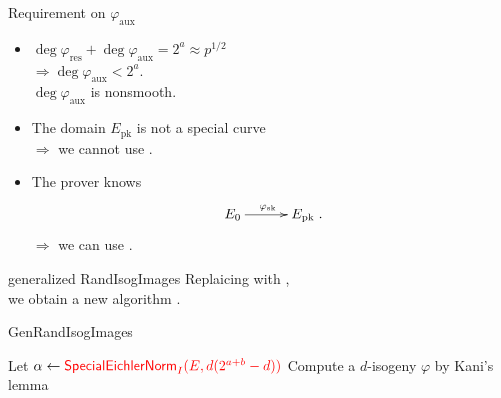 \begin{frame}{Requirement on $\varphi_\mathrm{aux}$}
    \begin{itemize}
        \setlength{\itemsep}{10pt}
        \item $\deg\varphi_\mathrm{res} + \deg\varphi_\mathrm{aux} = 2^a \approx p^{1/2}$\\[3pt]
            $\Rightarrow \deg\varphi_\mathrm{aux} < 2^a$.\\[3pt]
            \hphantom{$\Rightarrow$} $\deg\varphi_\mathrm{aux}$ is nonsmooth.
        \item The domain $E_\mathrm{pk}$ is not a special curve\\[3pt]
            $\Rightarrow$ we cannot use .
        \item The prover knows
                \begin{align*}
                    \xymatrix@C=30pt{
                        E_0 \ar[r]^{\varphi_\mathrm{sk}} & E_\mathrm{pk}
                    }.
                \end{align*}
            $\Rightarrow$ we can use .
    \end{itemize}

\end{frame}

\begin{frame}{generalized RandIsogImages}
    Replaicing  with ,\\
    we obtain a new algorithm .

    \vspace{10pt}
    \begin{algorithm}[H]
        \caption{\textsf{GenRandIsogImages}}
        \BlankLine
        Let $\alpha \leftarrow \textcolor{red}{\textsf{SpecialEichlerNorm}_{I}(E, d(2^{a+b} - d))}$\;
        Compute a $d$-isogeny $\varphi$ by Kani's lemma\;
        \Return{$\varphi$}\;
    \end{algorithm}
\end{frame}

